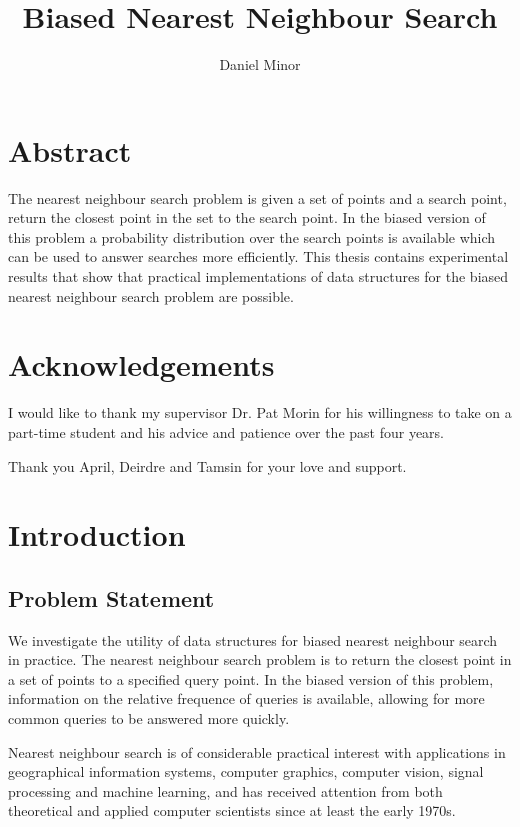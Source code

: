 \documentclass[mcs]{scsthesis}
\title {Biased Nearest Neighbour Search}
\author {Daniel Minor}
\begin{document}
\newtheorem*{thm}{Theorem}[section]

\beforepreface

\prefacesection

\chapter*{Abstract}

The nearest neighbour search problem is given a set of points and a search
point, return the closest point in the set to the search point. In the biased
version of this problem a probability distribution over the search points is
available which can be used to answer searches more efficiently. This thesis
contains experimental results that show that practical implementations of data
structures for the biased nearest neighbour search problem are possible.

\chapter*{Acknowledgements}

I would like to thank my supervisor Dr. Pat Morin for his willingness to take on
a part-time student and his advice and patience over the past four years.

Thank you April, Deirdre and Tamsin for your love and support.

\afterpreface

\chapter{Introduction}

\section{Problem Statement}

We investigate the utility of data structures for biased nearest neighbour
search in practice. The nearest neighbour search problem is to return the
closest point in a set of points to a specified query point. In the biased
version of this problem, information on the relative frequence of queries
is available, allowing for more common queries to be answered more quickly.

Nearest neighbour search is of considerable practical interest with
applications in geographical information systems, computer graphics,
computer vision, signal processing and machine learning, and has received
attention from both theoretical and applied computer scientists since at least
the early 1970s.
\end{document}
